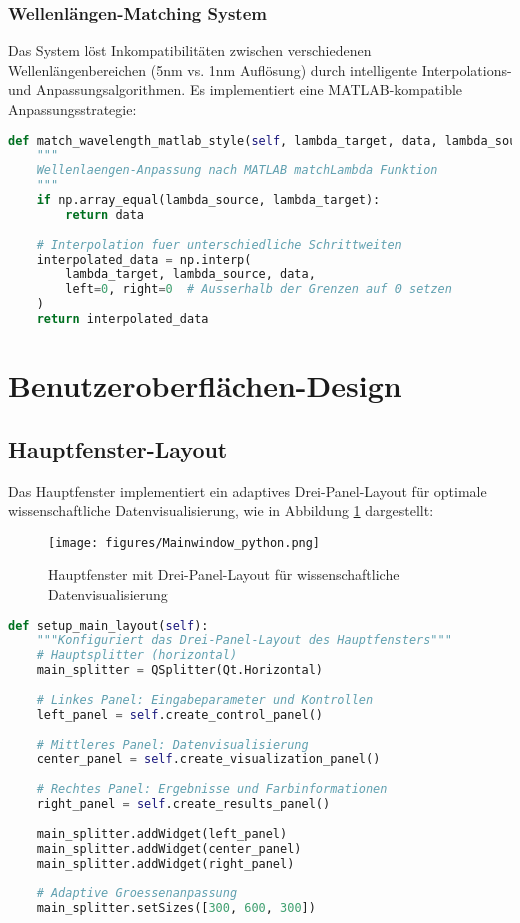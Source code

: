 \subsubsection{Wellenlängen-Matching System}

Das System löst Inkompatibilitäten zwischen verschiedenen Wellenlängenbereichen (5nm vs. 1nm Auflösung) durch intelligente Interpolations- und Anpassungsalgorithmen. Es implementiert eine MATLAB-kompatible Anpassungsstrategie:

\begin{lstlisting}[language=Python, caption=MATLAB-Stil Wellenlängen-Matching]
def match_wavelength_matlab_style(self, lambda_target, data, lambda_source):
    """
    Wellenlaengen-Anpassung nach MATLAB matchLambda Funktion
    """
    if np.array_equal(lambda_source, lambda_target):
        return data
    
    # Interpolation fuer unterschiedliche Schrittweiten
    interpolated_data = np.interp(
        lambda_target, lambda_source, data,
        left=0, right=0  # Ausserhalb der Grenzen auf 0 setzen
    )
    return interpolated_data
\end{lstlisting}

\section{Benutzeroberflächen-Design}

\subsection{Hauptfenster-Layout}

Das Hauptfenster implementiert ein adaptives Drei-Panel-Layout für optimale wissenschaftliche Datenvisualisierung, wie in Abbildung \ref{fig:Mainwindow_python} dargestellt:

\begin{figure}[H]
    \centering
\texttt{[image: figures/Mainwindow\_python.png]}
\caption{Hauptfenster mit Drei-Panel-Layout für wissenschaftliche Datenvisualisierung}
    \label{fig:Mainwindow_python}
\end{figure}

\begin{lstlisting}[language=Python, caption=Hauptfenster Layout-Konfiguration]
def setup_main_layout(self):
    """Konfiguriert das Drei-Panel-Layout des Hauptfensters"""
    # Hauptsplitter (horizontal)
    main_splitter = QSplitter(Qt.Horizontal)
    
    # Linkes Panel: Eingabeparameter und Kontrollen
    left_panel = self.create_control_panel()
    
    # Mittleres Panel: Datenvisualisierung
    center_panel = self.create_visualization_panel()
    
    # Rechtes Panel: Ergebnisse und Farbinformationen  
    right_panel = self.create_results_panel()
    
    main_splitter.addWidget(left_panel)
    main_splitter.addWidget(center_panel) 
    main_splitter.addWidget(right_panel)
    
    # Adaptive Groessenanpassung
    main_splitter.setSizes([300, 600, 300])
\end{lstlisting}

